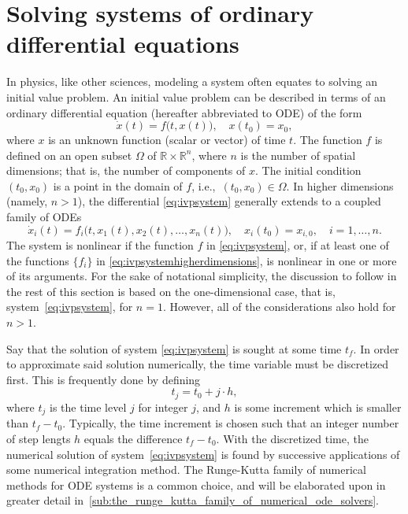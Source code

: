 \section[Solving systems of ordinary differential equations]%
{Solving systems of ordinary differential eq\null{}uations}%
\label{sec:solvingsystems}

In physics, like other sciences, modeling a system often equates to solving an
initial value problem. An initial value problem can be described in terms of an
ordinary differential equation (hereafter abbreviated to ODE) of the form
\begin{equation}
    \label{eq:ivpsystem}
    \dot{x}(t) = f\big(t,x(t)\big), \quad x(t_{0}) = x_{0},
\end{equation}
where $x$ is an unknown function (scalar or vector) of time $t$. The function
$f$ is defined on an open subset $\Omega$ of $\mathbb{R}\times\mathbb{R}^{n}$,
where $n$ is the number of spatial dimensions; that is, the number of components
of $x$. The initial condition $(t_{0},x_{0})$ is a point in the domain of $f$,
i.e.,\ $(t_{0},x_{0})\in\Omega$. In higher dimensions (namely, $n>1$), the
differential \cref{eq:ivpsystem} generally extends to a coupled family of ODEs
\begin{equation}
    \label{eq:ivpsystemhigherdimensions}
    \dot{x}_{i}(t) = f_{i}\big(t,x_{1}(t),x_{2}(t),\ldots,x_{n}(t)\big),%
    \quad x_{i}(t_{0}) = x_{i,0}, \quad i = 1,\ldots,n.
\end{equation}
The system is nonlinear if the function $f$ in \cref{eq:ivpsystem}, or, if at
least one of the functions $\{f_{i}\}$ in \cref{eq:ivpsystemhigherdimensions},
is nonlinear in one or more of its arguments. For the sake of notational
simplicity, the discussion to follow in the rest of this section is based
on the one-dimensional case, that is, system~\eqref{eq:ivpsystem}, for $n=1$.
However, all of the considerations also hold for $n>1$.

Say that the solution of system \eqref{eq:ivpsystem} is sought at some time
$t_{f}$. In order to approximate said solution numerically, the time variable
must be discretized first. This is frequently done by defining
\begin{equation}
    \label{eq:discretime}
    t_{j} = t_{0}+j\cdot{}h,
\end{equation}
where $t_{j}$ is the time level $j$ for integer $j$, and $h$ is some increment
which is smaller than $t_{f}-t_{0}$. Typically, the time increment is chosen
such that an integer number of step lengts $h$ equals the difference
$t_{f}-t_{0}$. With the discretized time, the numerical solution of
system~\eqref{eq:ivpsystem} is found by successive applications of some
numerical integration method. The Runge-Kutta family of numerical methods for
ODE systems is a common choice, and will be elaborated upon in greater detail
in~\cref{sub:the_runge_kutta_family_of_numerical_ode_solvers}.

